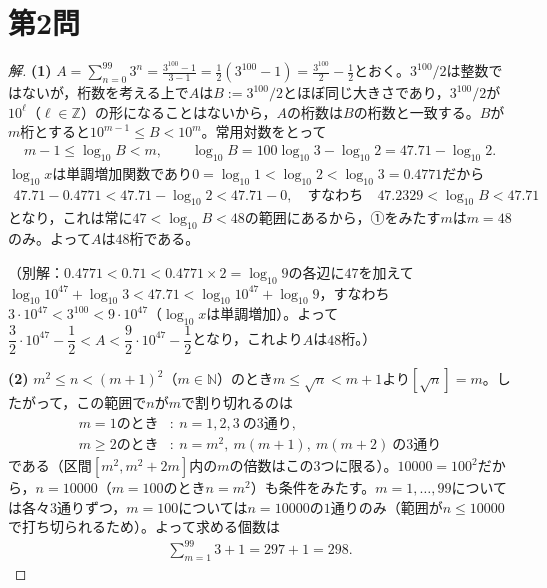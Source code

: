 \documentclass[../main.tex]{subfiles}
\begin{document}
\newpage

\section*{第2問}

\begin{proof}[解]
  \textbf{(1)} $A=\displaystyle\sum_{n=0}^{99}3^n=\frac{3^{100}-1}{3-1}=\frac12(3^{100}-1)=\frac{3^{100}}2-\frac12$とおく。$3^{100}/2$は整数ではないが，桁数を考える上で$A$は$B:=3^{100}/2$とほぼ同じ大きさであり，$3^{100}/2$が$10^\ell$（$\ell\in\mathbb Z$）の形になることはないから，$A$の桁数は$B$の桁数と一致する。$B$が$m$桁とすると$10^{m-1}\le B<10^m$。常用対数をとって
  \begin{align*}
    m-1\le\log_{10}B<m,\qquad\log_{10}B=100\log_{10}3-\log_{10}2=47.71-\log_{10}2.\tag{①}
  \end{align*}
  $\log_{10}x$は単調増加関数であり$0=\log_{10}1<\log_{10}2<\log_{10}3=0.4771$だから
  \begin{align*}
    47.71-0.4771<47.71-\log_{10}2<47.71-0,\quad\text{すなわち}\quad47.2329<\log_{10}B<47.71
  \end{align*}
  となり，これは常に$47<\log_{10}B<48$の範囲にあるから，①をみたす$m$は$m=48$のみ。よって$A$は$\boxed{48}$桁である。

  （別解：$0.4771<0.71<0.4771\times2=\log_{10}9$の各辺に$47$を加えて$\log_{10}10^{47}+\log_{10}3<47.71<\log_{10}10^{47}+\log_{10}9$，すなわち$3\cdot10^{47}<3^{100}<9\cdot10^{47}$（$\log_{10}x$は単調増加）。よって$\dfrac32\cdot10^{47}-\dfrac12<A<\dfrac92\cdot10^{47}-\dfrac12$となり，これより$A$は$48$桁。）

  \textbf{(2)} $m^2\le n<(m+1)^2$（$m\in\mathbb N$）のとき$m\le\sqrt n<m+1$より$[\sqrt n]=m$。したがって，この範囲で$n$が$m$で割り切れるのは
  \begin{align*}
    m=1\text{のとき}&:\ n=1,2,3\ \text{の}3\text{通り},\\
    m\ge2\text{のとき}&:\ n=m^2,\ m(m+1),\ m(m+2)\ \text{の}3\text{通り}
  \end{align*}
  である（区間$[m^2,m^2+2m]$内の$m$の倍数はこの3つに限る）。$10000=100^2$だから，$n=10000$（$m=100$のとき$n=m^2$）も条件をみたす。$m=1,\dots,99$については各々$3$通りずつ，$m=100$については$n=10000$の$1$通りのみ（範囲が$n\le10000$で打ち切られるため）。よって求める個数は
  \begin{align*}
    \sum_{m=1}^{99}3+1=297+1=298.
  \end{align*}
\end{proof}
\end{document}
